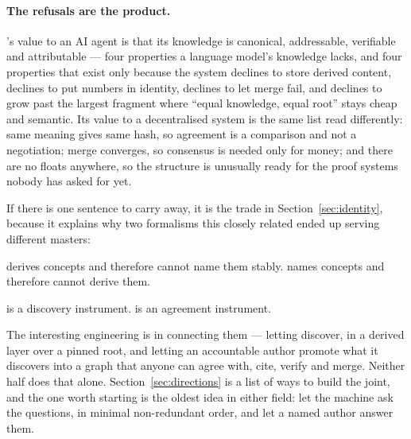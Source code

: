 \paragraph{The refusals are the product.} \odag{}'s value to an AI agent is
that its knowledge is canonical, addressable, verifiable and attributable ---
four properties a language model's knowledge lacks, and four properties that
exist only because the system declines to store derived content, declines to
put numbers in identity, declines to let merge fail, and declines to grow past
the largest fragment where ``equal knowledge, equal root'' stays cheap and
semantic. Its value to a decentralised system is the same list read
differently: same meaning gives same hash, so agreement is a comparison and
not a negotiation; merge converges, so consensus is needed only for money;
and there are no floats anywhere, so the structure is unusually ready for the
proof systems nobody has asked for yet.

\medskip

If there is one sentence to carry away, it is the trade in
Section~\ref{sec:identity}, because it explains why two formalisms this
closely related ended up serving different masters:

\begin{keyidea}
\fca{} derives concepts and therefore cannot name them stably.
\odag{} names concepts and therefore cannot derive them.

\fca{} is a discovery instrument. \odag{} is an agreement instrument.
\end{keyidea}

The interesting engineering is in connecting them --- letting \fca{} discover,
in a derived layer over a pinned root, and letting an accountable author
promote what it discovers into a graph that anyone can agree with, cite,
verify and merge. Neither half does that alone. Section~\ref{sec:directions}
is a list of ways to build the joint, and the one worth starting is the oldest
idea in either field: let the machine ask the questions, in minimal
non-redundant order, and let a named author answer them.
